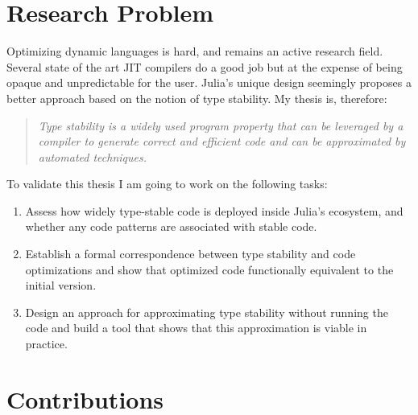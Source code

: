\documentclass[oneside,openright,titlepage,numbers=noenddot,%
headinclude,footinclude,cleardoublepage=empty,abstract=on,
BCOR=5mm,paper=a4,fontsize=11pt,
dvipsnames
]{scrreprt}
\newenvironment{itquote}{\begin{quote}\itshape}{\end{quote}\ignorespacesafterend}
\begin{document}


\chapter{Research Problem}
\label{chap-problem}

Optimizing dynamic languages is hard, and remains an active research field.
Several state of the art JIT compilers do a good job but at the expense of being
opaque and unpredictable for the user.
Julia's unique design seemingly proposes a better approach based on the notion
of type stability. My thesis is, therefore:

\begin{itquote}
Type stability
is a widely used program property that can be leveraged by a compiler to generate
correct and efficient code
and can be approximated by automated techniques.
\end{itquote}

To validate this thesis I am going to work on the following tasks:
\begin{enumerate}

  \item
  Assess how widely type-stable code is deployed inside Julia's ecosystem, and
  whether any code patterns are associated with stable code.

  \item
  Establish a formal correspondence between type stability and code optimizations and
  show that optimized code functionally equivalent to the initial version.

  \item
  Design an approach for approximating type stability without running the code and
  build a tool that shows that this approximation is viable in practice.
\end{enumerate}





\chapter{Contributions}%
\label{chap-contrib}
\end{document}
